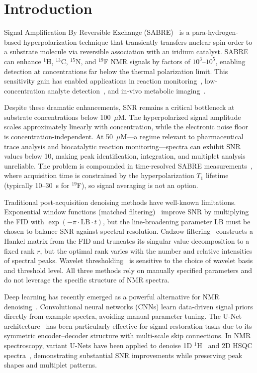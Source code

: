 \documentclass{article}
\begin{document}
\section{Introduction}

Signal Amplification By Reversible Exchange (SABRE)~\cite{Adams2009,Duckett2012} is a para-hydrogen-based hyperpolarization technique that transiently transfers nuclear spin order to a substrate molecule via reversible association with an iridium catalyst. SABRE can enhance $^1$H, $^{13}$C, $^{15}$N, and $^{19}$F NMR signals by factors of $10^3$--$10^5$, enabling detection at concentrations far below the thermal polarization limit. This sensitivity gain has enabled applications in reaction monitoring~\cite{Eshuis2014}, low-concentration analyte detection~\cite{Rayner2017}, and in-vivo metabolic imaging~\cite{Hovener2013}.

Despite these dramatic enhancements, SNR remains a critical bottleneck at substrate concentrations below 100~$\mu$M. The hyperpolarized signal amplitude scales approximately linearly with concentration, while the electronic noise floor is concentration-independent. At 50~$\mu$M---a regime relevant to pharmaceutical trace analysis and biocatalytic reaction monitoring---spectra can exhibit SNR values below 10, making peak identification, integration, and multiplet analysis unreliable. The problem is compounded in time-resolved SABRE measurements~\cite{Rayner2024}, where acquisition time is constrained by the hyperpolarization $T_1$ lifetime (typically 10--30~s for $^{19}$F), so signal averaging is not an option.

Traditional post-acquisition denoising methods have well-known limitations. Exponential window functions (matched filtering)~\cite{Levitt2008,Ernst1987} improve SNR by multiplying the FID with $\exp(-\pi\cdot\mathrm{LB}\cdot t)$, but the line-broadening parameter LB must be chosen to balance SNR against spectral resolution. Cadzow filtering~\cite{Cadzow1988} constructs a Hankel matrix from the FID and truncates its singular value decomposition to a fixed rank $r$, but the optimal rank varies with the number and relative intensities of spectral peaks. Wavelet thresholding~\cite{Donoho1995} is sensitive to the choice of wavelet basis and threshold level. All three methods rely on manually specified parameters and do not leverage the specific structure of NMR spectra.

Deep learning has recently emerged as a powerful alternative for NMR denoising~\cite{Lee2021,Qu2024,Chen2021,Kobayashi2022}. Convolutional neural networks (CNNs) learn data-driven signal priors directly from example spectra, avoiding manual parameter tuning. The U-Net architecture~\cite{Ronneberger2015} has been particularly effective for signal restoration tasks due to its symmetric encoder--decoder structure with multi-scale skip connections. In NMR spectroscopy, variant U-Nets have been applied to denoise 1D $^1$H~\cite{Lee2021} and 2D HSQC spectra~\cite{Qu2024}, demonstrating substantial SNR improvements while preserving peak shapes and multiplet patterns.
\end{document}
